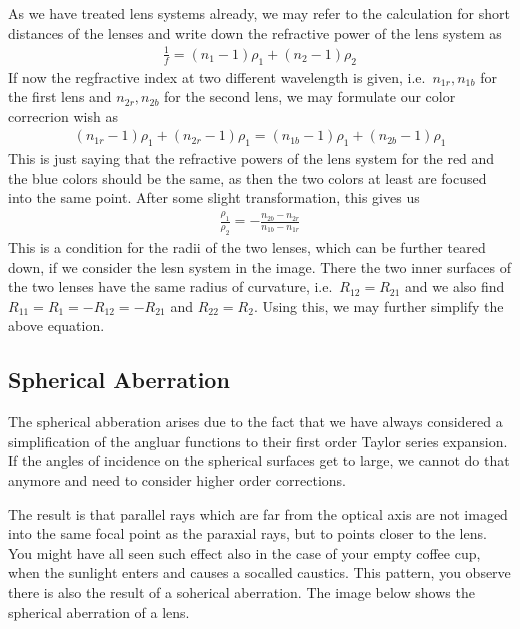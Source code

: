 \documentclass[letterpaper,10pt,english]{sphinxmanual}
\begin{document}
As we have treated lens systems already, we may refer to the calculation for short distances of the lenses and write down the refractive power of the lens system as
\begin{equation*}
\begin{split}\frac{1}{f}=(n_1-1)\rho_1+(n_2-1)\rho_2\end{split}
\end{equation*}
If now the regfractive index at two different wavelength is given, i.e. \(n_{1r},n_{1b}\) for the first lens and \(n_{2r},n_{2b}\) for the second lens, we may formulate our color correcrion wish as
\begin{equation*}
\begin{split}(n_{1r}-1)\rho_1+(n_{2r}-1)\rho_1=(n_{1b}-1)\rho_1+(n_{2b}-1)\rho_1\end{split}
\end{equation*}
This is just saying that the refractive powers of the lens system for the red and the blue colors should be the same, as then the two colors at least are focused into the same point. After some slight transformation, this gives us
\begin{equation*}
\begin{split}\frac{\rho_1}{\rho_2}=-\frac{n_{2b}-n_{2r}}{n_{1b}-n_{1r}}\end{split}
\end{equation*}
This is a condition for the radii of the two lenses, which can be further teared down, if we consider the lesn system in the image. There the two inner surfaces of the two lenses have the same radius of curvature, i.e. \(R_{12}=R_{21}\) and we also find \(R_{11}=R_1=-R_{12}=-R_{21}\) and \(R_{22}=R_2\). Using this, we may further simplify the above equation.


\subsection{Spherical Aberration}
\label{\detokenize{notebooks/L7/Imaging Errors:Spherical-Aberration}}
The spherical abberation arises due to the fact that we have always considered a simplification of the angluar functions to their first order Taylor series expansion. If the angles of incidence on the spherical surfaces get to large, we cannot do that anymore and need to consider higher order corrections.

The result is that parallel rays which are far from the optical axis are not imaged into the same focal point as the paraxial rays, but to points closer to the lens. You might have all seen such effect also in the case of your empty coffee cup, when the sunlight enters and causes a so\sphinxhyphen{}called caustics. This pattern, you observe there is also the result of a soherical aberration. The image below shows the spherical aberration of a lens.
\end{document}
